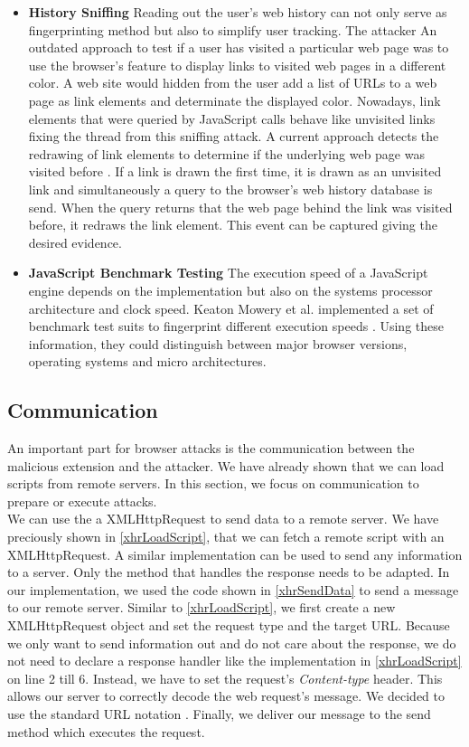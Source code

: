 \begin{itemize}
		\item \textbf{History Sniffing} Reading out the user's web history can not only serve as fingerprinting method but also to simplify user tracking. The attacker  An outdated approach to test if a user has visited a particular web page was to use the browser's feature to display links to visited web pages in a different color. A web site would hidden from the user add a list of URLs to a web page as link elements and determinate the displayed color. Nowadays, link elements that were queried by JavaScript calls behave like unvisited links fixing the thread from this sniffing attack. A current approach detects the redrawing of link elements to determine if the underlying web page was visited before \cite{paulstone_historysniffing}. If a link is drawn the first time, it is drawn as an unvisited link and simultaneously a query to the browser's web history database is send. When the query returns that the web page behind the link was visited before, it redraws the link element. This event can be captured giving the desired evidence.
		
		\item \textbf{JavaScript Benchmark Testing} The execution speed of a JavaScript engine depends on the implementation but also on the systems processor architecture and clock speed. Keaton Mowery et al. implemented a set of benchmark test suits to fingerprint different execution speeds \cite{MBYS11}. Using these information, they could distinguish between major browser versions, operating systems and micro architectures. 
	\end{itemize}



\subsection{Communication}

	An important part for browser attacks is the communication between the malicious extension and the attacker. We have already shown that we can load scripts from remote servers. In this section, we focus on communication to prepare or execute attacks. \\ %
	
	We can use the a XMLHttpRequest to send data to a remote server. We have preciously shown in \autoref{xhrLoadScript}, that we can fetch a remote script with an XMLHttpRequest. A similar implementation can be used to send any information to a server. Only the method that handles the response needs to be adapted. In our implementation, we used the code shown in \autoref{xhrSendData} to send a message to our remote server. Similar to \autoref{xhrLoadScript}, we first create a new XMLHttpRequest object and set the request type and the target URL. Because we only want to send information out and do not care about the response, we do not need to declare a response handler like the implementation in \autoref{xhrLoadScript} on line 2 till 6. Instead, we have to set the request's \textit{Content-type} header. This allows our server to correctly decode the web request's message. We decided to use the standard URL notation \cite{w3cUrlSpecifications}. Finally, we deliver our message to the send method which executes the request. 
	
